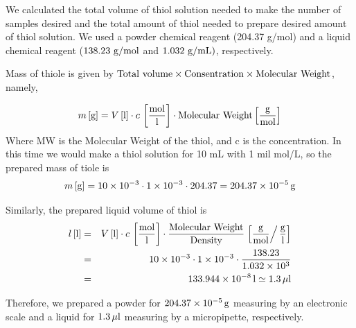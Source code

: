 We calculated the total volume of thiol solution needed to make the number of samples desired and the total amount of thiol needed to prepare desired amount of thiol solution. We used a powder chemical reagent (204.37 g/mol) and a liquid chemical reagent ($138.23 \ {\rm g/mol}$ and $1.032 \ {\rm g/mL})$, respectively. 

Mass of thiole is given by 
$ {\rm Total\ volume \times Consentration \times Molecular \ Weight}$, namely,

\begin{equation}
 m\, [{\rm g}]=V \, [{\rm l}] \cdot c \, \left[ \frac{{{\rm mol}}}{\rm l}\right] \cdot 
\text{Molecular Weight} \left[ \frac{\rm g}{{\rm mol}}\right]
\end{equation}
Where MW is the Molecular Weight of the thiol, and c is the concentration.
In this time we would make a thiol solution for 10 mL with 1 mil mol/L, so the prepared mass of tiole is 
\begin{eqnarray}
m\, [{\rm g}]=10\times 10^{-3}\cdot 1\times 10^{-3} 
\cdot  204.37  \nonumber
=204.37 \times 10^{-5} \, {\rm g}
\end{eqnarray}

Similarly, the prepared liquid volume of thiol is
\begin{eqnarray}
 l\, [{\rm l}] &=& V \, [{\rm l}] \cdot c \, \left[ \frac{{{\rm mol}}}{\rm l}\right] \cdot 
\frac{\rm Molecular \ Weight}{\rm Density} \left.  \left[ \frac{\rm g}{{\rm mol} }\right/\frac{\rm g}{\rm l}\right] \nonumber \\
& =& 10\times 10^{-3}\cdot 1\times 10^{-3} \cdot  \frac{138.23}{1.032\times 10^{3}} \nonumber \\
&=& 133.944 \times 10^{-8} \, {\rm l} \simeq 1.3 \, \mu \rm l
\end{eqnarray}

Therefore, we prepared a powder for $204.37 \times 10^{-5} \, \rm g$ measuring by an electronic scale and a liquid for $1.3 \, \mu  \rm l$ measuring by a micropipette, respectively.



